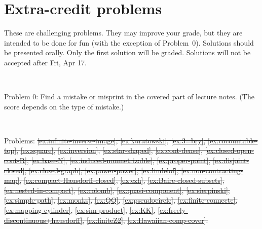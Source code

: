 \section*{Extra-credit problems}

These are challenging problems.
They may improve your grade, but they are intended to be done for fun (with the exception of Problem~0).
Solutions should be presented orally.
Only the first solution will be graded.
Solutions will not be accepted after Fri, Apr 17.

\

\noindent Problem 0: Find a mistake or misprint in the covered part of lecture notes.
(The score depends on the type of mistake.)

\

\noindent Problems:
\sout{\ref{ex:infinite-inverse-image},
\ref{ex:kuratowski},
\ref{ex:3=bry},
\ref{ex:cocountable-top},
\ref{ex:square},
\ref{ex:inversion},
\ref{ex:star-shaped},
\ref{ex:cont-dense},
\ref{ex:closed-open-cont-R},
\ref{ex:base-N},
\ref{ex:induced-nonmetrizable},
\ref{ex:proper-point},
\ref{ex:disjoint-closed},
\ref{ex:closed-graph},
\ref{ex:power-power},
\ref{ex:lindelof},
\ref{ex:non-contracting-map},
\ref{ex:compact-Hausdorff-closed},
\ref{ex:ezh},
\ref{ex:Baire-closed-subsets},
\ref{ex:nested-in-compact},
\ref{ex:colomb},
\ref{ex:quasi-component},
\ref{ex:sierpinski},
\ref{ex:simple-path},
\ref{ex:monks},
\ref{ex:QQ},
\ref{ex:pseudocircle},
\ref{ex:finite-connecte},
\ref{ex:mapping-cylinder},
\ref{ex:sim-product},
\ref{ex:KK},
\ref{ex:freely-discontinuous+hausdorff},
\ref{ex:finiteZ2},
\ref{ex:Hawaiian-comp-cover}.}

\newpage

